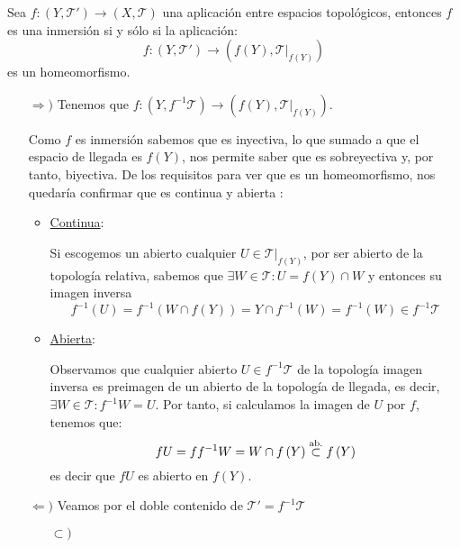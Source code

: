 \begin{prop}
Sea $f: \left( Y, \mathcal{T}' \right) \rightarrow \left( X, \mathcal{T} \right)$ una aplicación entre espacios topológicos, entonces $f$ es una inmersión si y sólo si la aplicación:
\[
f: \left( Y, \mathcal{T}' \right) \longrightarrow \left( f\left( Y \right), \mathcal{T}|_{f\left( Y \right)} \right)
\]
es un homeomorfismo.
\end{prop}
\begin{demo}
\begin{itemize}
    \item[$\Rightarrow)$] Tenemos que $f: \left( Y, f^{-1}\mathcal{T} \right) \rightarrow \left( f\left( Y \right), \mathcal{T}|_{f\left( Y \right)} \right)$. 

    Como $f$ es inmersión sabemos que es inyectiva, lo que sumado a que el espacio de llegada es $f(Y)$, nos permite saber que es sobreyectiva y, por tanto, biyectiva. De los requisitos para ver que es un homeomorfismo, nos quedaría confirmar que es continua y abierta :
    \begin{itemize}
        \item \underline{Continua}:
        
        Si escogemos un abierto cualquier $U\in \mathcal{T}|_{f(Y)}$, por ser abierto de la topología relativa, sabemos que $\exists W \in \mathcal{T}: U = f\left( Y \right) \cap W $ y entonces su imagen inversa
        \[
        f^{-1}\left( U \right) = f^{-1}\left( W \cap f\left( Y \right) \right) = Y \cap f^{-1}\left( W \right) = f^{-1}\left( W \right) \in f^{-1}\mathcal{T}
        \]

        \item \underline{Abierta}:
        
        Observamos que cualquier abierto $U \in f^{-1}\mathcal{T}$ de la topología imagen inversa es preimagen de un abierto de la topología de llegada, es decir, $\exists W \in \mathcal{T}: f^{-1}W = U$. Por tanto, si calculamos la imagen de $U$ por $f$, tenemos que:
        \[
        fU = ff^{-1}W = W \cap f\left( Y \right) \stackrel{\text{ab.}}{\subset} f\left( Y \right)
        \]
        es decir que $fU$ es abierto en $f\left( Y \right)$.
    \end{itemize}

    \item[$\Leftarrow)$] Veamos por el doble contenido de $\mathcal{T}' = f^{-1}\mathcal{T}$
    \begin{itemize}
        \item[$\subset)$]
        

\end{itemize}
\end{itemize}
\end{demo}
